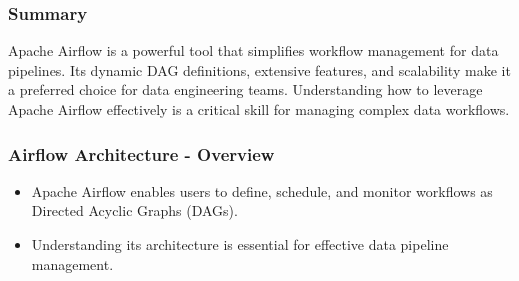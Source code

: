 \documentclass[aspectratio=169]{beamer}
\begin{document}
\begin{frame}[fragile]
    \frametitle{Summary}
    Apache Airflow is a powerful tool that simplifies workflow management for data pipelines. Its dynamic DAG definitions, extensive features, and scalability make it a preferred choice for data engineering teams. Understanding how to leverage Apache Airflow effectively is a critical skill for managing complex data workflows.
\end{frame}

\begin{frame}[fragile]
    \frametitle{Airflow Architecture - Overview}
    \begin{itemize}
        \item Apache Airflow enables users to define, schedule, and monitor workflows as Directed Acyclic Graphs (DAGs).
        \item Understanding its architecture is essential for effective data pipeline management.
    \end{itemize}
\end{frame}
\end{document}
